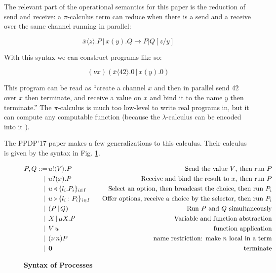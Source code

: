 \documentclass[runningheads,plain]{llncs}
\begin{document}
The relevant part of the operational semantics for this paper is the
reduction of send and receive: a \(\pi\)-calculus term can reduce when
there is a send and a receive over the same channel running in parallel:

\[\overline{x}\langle z \rangle.P\, |\, x(y).Q \rightarrow P | Q[z/y]\]

With this syntax we can construct programs like so:

\[(\nu x)(\overline{x}\langle 42 \rangle.0\, |\, x(y).0)\]

This program can be read as ``create a channel \(x\) and then in
parallel send 42 over \(x\) then terminate, and receive a value on \(x\)
and bind it to the name \(y\) then terminate.'' The \(\pi\)-calculus is
much too low-level to write real programs in, but it can compute any
computable function (because the \(\lambda\)-calculus can be encoded
into it \cite{milner1992functions}).

The PPDP'17 paper makes a few generalizations to this calculus. Their
calculus is given by the syntax in Fig. \ref{fig:process-syntax}.

\begin{figure}[h!]
\begin{align*}
P, Q ::= \, 
        & u ! \langle V \rangle .{P} \,\,\, \, \, &\text{Send the value }V\text{, then run }P \\
|\,\,\, & u ? (x) .{P} \,\,\, \, \, & \text{Receive and bind the result to }x\text{, then run }P \\
|\,\,\, &  u \triangleleft \{l_i. P_i\}_{i\in I}\,\,\, \, \, & \text{Select an option, then broadcast the choice, then run }P_i \\
|\,\,\, & u \triangleright \{l_i:P_i\}_{i \in I} \,\,\, \, \, & \text{Offer options, receive a choice by the selector, then run } P_i \\
|\,\,\, & (P\,|\,Q) \,\,\, \, \, \, \, \, \, &\text{Run }P\text{ and }Q\text{ simultaneously} \\
|\,\,\, & X \,|\, \mu X. P \,\,\, &\text{Variable and function abstraction}\\
|\,\,\, & V\, {u} \,\,\, &\text{function application} \\
|\,\,\, & (\nu\, n)P \,\,\, &\text{name restriction: make $n$ local in a term} \\
|\,\,\, & \mathbf{0} \,\,\, &\text{terminate} \\
\end{align*}
\caption{\textbf{Syntax of Processes}}
\label{fig:process-syntax}
\end{figure}
\end{document}
